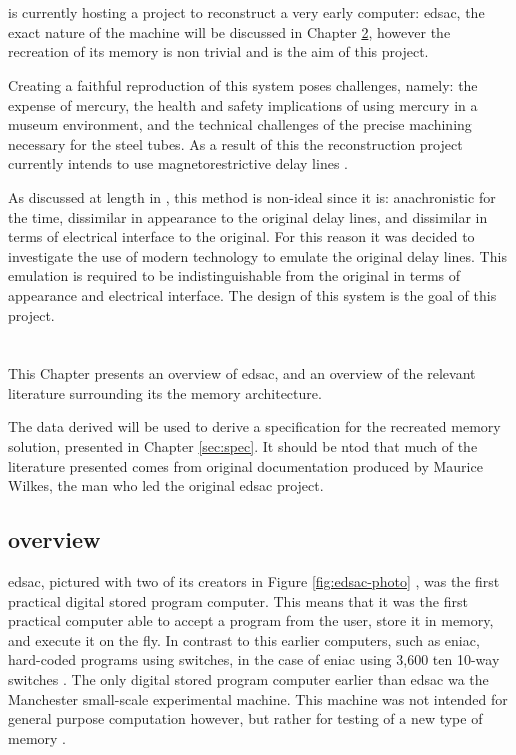
\chapter{} \label{sec:intro}
 is currently hosting a project to reconstruct a very early computer: \gls{edsac}, the exact nature of the machine will be discussed in Chapter \ref{sec:tech-rev}, however the recreation of its memory is non trivial and is the aim of this project.


Creating a faithful reproduction of this system poses challenges, namely: the expense of mercury, the health and safety implications of using mercury in a museum environment, and the technical challenges of the precise machining necessary for the steel tubes. As a result of this the reconstruction project currently intends to use magnetorestrictive delay lines \cite{ward2011}.

As discussed at length in \cite{tyler2017}, this method is non-ideal since it is: anachronistic for the time, dissimilar in appearance to the original delay lines, and dissimilar in terms of electrical interface to the original. For this reason it was decided to investigate the use of modern technology to emulate the original delay lines. This emulation is required to be indistinguishable from the original in terms of appearance and electrical interface. The design of this system is the goal of this project.

\chapter{} \label{sec:tech-rev}
This Chapter presents an overview of \gls{edsac}, and an overview of the relevant literature surrounding its the memory architecture.

The data derived will be used to derive a specification for the recreated memory solution, presented in Chapter \ref{sec:spec}. It should be ntod that much of the literature presented comes from original documentation produced by Maurice Wilkes, the man who led the original \gls{edsac} project.

\section{ overview} \label{sec:edsac-overview}
\Gls{edsac}, pictured with two of its creators in Figure \ref{fig:edsac-photo} \cite{cam2011}, was the first practical digital stored program computer. This means that it was the first practical computer able to accept a program from the user, store it in memory, and execute it on the fly. In contrast to this earlier computers, such as \gls{eniac}, hard-coded programs using switches, in the case of \gls{eniac} using 3,600 ten 10-way switches \cite{cruz2013}. The only digital stored program computer earlier than \gls{edsac} wa the Manchester small-scale experimental machine. This machine was not intended for general purpose computation however, but rather for testing of a new type of memory \cite{jones2001}.


